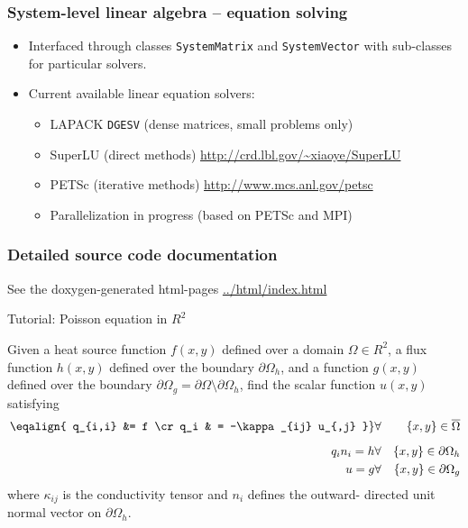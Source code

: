 \documentclass{beamer}
\begin{document}
\frame %
{
 \frametitle{System-level linear algebra -- equation solving}

 \begin{itemize}
  \item Interfaced through classes {\color{red}\tt SystemMatrix} and
        {\color{red}\tt SystemVector} with sub-classes for particular solvers.
  \vskip5pt
  \item Current available linear equation solvers:
  \begin{itemize}
   \item LAPACK {\tt DGESV} (dense matrices, small problems only)
   \item SuperLU (direct methods)
         \hfill{\scriptsize\url{http://crd.lbl.gov/~xiaoye/SuperLU}}
   \item PETSc (iterative methods)
         \hfill{\scriptsize\url{http://www.mcs.anl.gov/petsc}}
   \item Parallelization in progress (based on PETSc and MPI)
  \end{itemize}
 \end{itemize}
}

\frame %
{
 \frametitle{Detailed source code documentation}

 See the doxygen-generated html-pages \url{../html/index.html}
}

\frame %
{
 \begin{center}
  \huge\color{blue} Tutorial: Poisson equation in $R^2$
 \end{center}

 Given a heat source function $f(x,y)$ defined over a domain
 $\Omega\in R^2$, a flux function $h(x,y)$ defined over the boundary
 $\partial\Omega_h$, and a function $g(x,y)$ defined over the boundary
 $\partial\Omega_g = \partial\Omega\setminus\partial\Omega_h$,
 find the scalar function $u(x,y)$ satisfying
 \begin{eqnarray}
  \left.\eqalign{
  q_{i,i} &= f \cr
  q_i & = -\kappa_{ij} u_{,j}
  }\right\} &\forall& \{x,y\}\in\overline{\Omega} \\[2mm]
  q_i n_i = h &\forall& \{x,y\}\in\partial\Omega_h \\
  u = g &\forall&\{x,y\}\in\partial\Omega_g
 \end{eqnarray}
 where $\kappa_{ij}$ is the conductivity tensor and $n_i$ defines the outward-
 directed unit normal vector on $\partial\Omega_h$.
}
\end{document}
